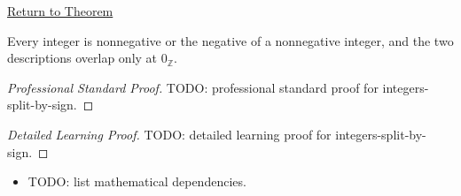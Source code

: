 \newpage
{}
\label{prf:integers-split-by-sign}

\begin{remark*}[Return]
\hyperref[cor:integers-split-by-sign]{Return to Theorem}
\end{remark*}

\begin{corollary*}
Every integer is nonnegative or the negative of a nonnegative integer, and
the two descriptions overlap only at $0_{\mathbb{Z}}$.
\end{corollary*}

\begin{proof}[Professional Standard Proof]
\LRAProofBodyStart
TODO: professional standard proof for integers-split-by-sign.
\end{proof}

\begin{proof}[Detailed Learning Proof]
\LRAProofBodyStart
TODO: detailed learning proof for integers-split-by-sign.
\end{proof}

\begin{remark*}
\end{remark*}

\begin{dependencies}
\begin{itemize}
  \item TODO: list mathematical dependencies.
\end{itemize}
\end{dependencies}

\clearpage
